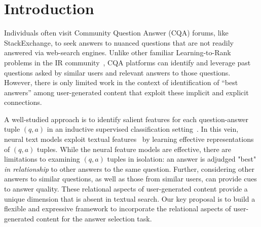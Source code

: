 \section{Introduction}

Individuals often visit Community Question Answer (CQA) forums, like StackExchange, to seek answers to nuanced questions that are not readily answered via web-search engines. Unlike other familiar Learning-to-Rank problems in the IR community~\cite{LambdaMart,LambdaNet}, CQA platforms can identify and leverage past questions asked by similar users and relevant answers to those questions. However, there is only limited work in the context of identification of ``best answers'' among user-generated content that exploit these implicit and explicit connections.

A well-studied approach is to identify salient features for each question-answer tuple $(q,a)$ in an inductive supervised classification setting~\cite{BurelMA16,JendersKN16,TianZL13}. In this vein, neural text models exploit textual features~\cite{ZhangLSW17,WuWS18,WangN15} by learning effective representations of $(q,a)$ tuples. While the neural feature models are effective, there are limitations to examining $(q,a)$ tuples in isolation: an answer is adjudged "best" \emph{in relationship} to other answers to the same question. Further, considering other answers to similar questions, as well as those from similar users, can provide cues to answer quality.
These relational aspects of user-generated content provide a unique dimension that is absent in textual search. Our key proposal is to build a flexible and expressive framework to incorporate the relational aspects of user-generated content for the answer selection task. %

